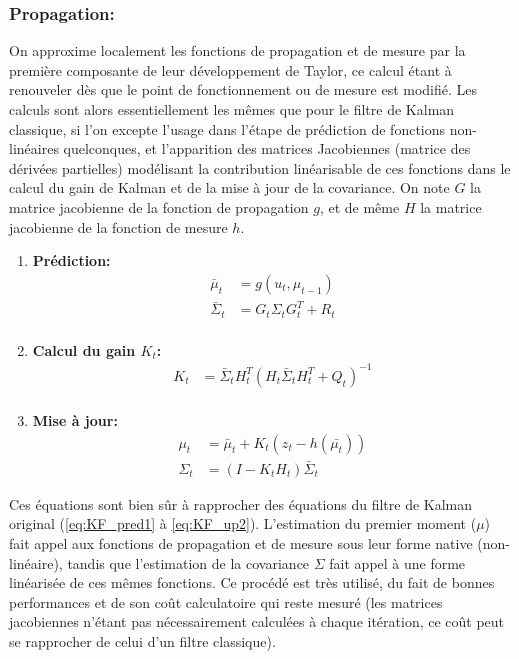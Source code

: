 \subsubsection{Propagation:}
On approxime localement les fonctions de propagation et de mesure par la première composante de leur développement de Taylor, ce calcul étant à renouveler dès que le point de fonctionnement ou de mesure est modifié. Les calculs sont alors essentiellement les mêmes que pour le filtre de Kalman classique, si l'on excepte l'usage dans l'étape de prédiction de fonctions non-linéaires quelconques, et l'apparition des matrices Jacobiennes (matrice des dérivées partielles) modélisant la contribution linéarisable de ces fonctions dans le calcul du gain de Kalman et de la mise à jour de la covariance. On note $G$ la matrice jacobienne de la fonction de propagation $g$, et de même $H$ la matrice jacobienne de la fonction de mesure $h$. 
\begin{enumerate}
	\item{\textbf{Prédiction:}}
	\begin{align}
		\bar{\mu}_t    	&= g(u_t, \mu_{t-1}) \label{eq:EKF_pred1} \\ 
		\bar{\Sigma}_t 	&= G_t \Sigma_t G_t^T + R_t \label{eq:EKF_pred2}\\ \nonumber
	\end{align}
	
	\item{\textbf{Calcul du gain $K_t$:}}
	\begin{align}
		K_t	&= \bar{\Sigma}_t H_t^T \left( H_t \bar{\Sigma}_t  H_t^T  + Q_t\right)^{-1}	\label{eq:EKF_KG}\\	\nonumber
	\end{align}
	
	\item{\textbf{Mise à jour:}}
	\begin{align}
		\mu_t 			&= \bar{\mu}_t + K_t \left(z_t - h(\bar{\mu_t}) \right) \label{eq:EKF_up1}\\
		\Sigma_t		&= \left( I - K_t H_t \right) \bar{\Sigma}_t \label{eq:EKF_up2}
	\end{align}
\end{enumerate}
Ces équations sont bien sûr à rapprocher des équations du filtre de Kalman original (\ref{eq:KF_pred1} à \ref{eq:KF_up2}). L'estimation du premier moment ($\mu$) fait appel aux fonctions de propagation et de mesure sous leur forme \og native\fg{} (non-linéaire), tandis que l'estimation de la covariance $\Sigma$ fait appel à une forme linéarisée de ces mêmes fonctions. Ce procédé est très utilisé, du fait de bonnes performances et de son coût calculatoire qui reste mesuré (les matrices jacobiennes n'étant pas nécessairement calculées à chaque itération, ce coût peut se rapprocher de celui d'un filtre \og classique\fg{}). \\


